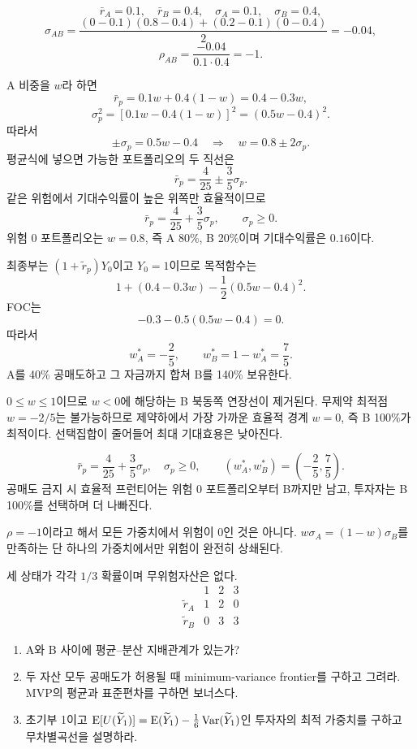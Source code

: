\begin{solutionbox}
\[
\bar r_A=0.1,\quad \bar r_B=0.4,
\quad\sigma_A=0.1,\quad\sigma_B=0.4,
\]
\[
\sigma_{AB}=\frac{(0-0.1)(0.8-0.4)+(0.2-0.1)(0-0.4)}2=-0.04,
\]
\[
\rho_{AB}=\frac{-0.04}{0.1\cdot0.4}=-1.
\]

A 비중을 $w$라 하면
\[
\bar r_p=0.1w+0.4(1-w)=0.4-0.3w,
\]
\[
\sigma_p^2=[0.1w-0.4(1-w)]^2=(0.5w-0.4)^2.
\]
따라서
\[
\pm\sigma_p=0.5w-0.4
\quad\Longrightarrow\quad
w=0.8\pm2\sigma_p.
\]
평균식에 넣으면 가능한 포트폴리오의 두 직선은
\[
\bar r_p=\frac4{25}\pm\frac35\sigma_p.
\]
같은 위험에서 기대수익률이 높은 위쪽만 효율적이므로
\[
\boxed{\bar r_p=\frac4{25}+\frac35\sigma_p,\qquad\sigma_p\ge0}.
\]
위험 0 포트폴리오는 $w=0.8$, 즉 A 80\%, B 20\%이며 기대수익률은 $0.16$이다.

최종부는 $(1+\widetilde r_p)Y_0$이고 $Y_0=1$이므로 목적함수는
\[
1+(0.4-0.3w)-\frac12(0.5w-0.4)^2.
\]
FOC는
\[
-0.3-0.5(0.5w-0.4)=0.
\]
따라서
\[
\boxed{w_A^*=-\frac25,\qquad w_B^*=1-w_A^*=\frac75}.
\]
A를 40\% 공매도하고 그 자금까지 합쳐 B를 140\% 보유한다.

$0\le w\le1$이므로 $w<0$에 해당하는 B 북동쪽 연장선이 제거된다. 무제약 최적점 $w=-2/5$는 불가능하므로 제약하에서 가장 가까운 효율적 경계 $w=0$, 즉 B 100\%가 최적이다. 선택집합이 줄어들어 최대 기대효용은 낮아진다.
\end{solutionbox}

\begin{answerbox}
\[
\bar r_p=\frac4{25}+\frac35\sigma_p,\quad\sigma_p\ge0,
\qquad
(w_A^*,w_B^*)=\left(-\frac25,\frac75\right).
\]
공매도 금지 시 효율적 프런티어는 위험 0 포트폴리오부터 B까지만 남고, 투자자는 B 100\%를 선택하며 더 나빠진다.
\end{answerbox}

\begin{warningbox}
$\rho=-1$이라고 해서 모든 가중치에서 위험이 0인 것은 아니다. $w\sigma_A=(1-w)\sigma_B$를 만족하는 단 하나의 가중치에서만 위험이 완전히 상쇄된다.
\end{warningbox}

\begin{officialbox}
세 상태가 각각 $1/3$ 확률이며 무위험자산은 없다.
\[
\begin{array}{c|ccc}
&1&2&3\\\hline
\widetilde r_A&1&2&0\\
\widetilde r_B&0&3&3
\end{array}
\]
\begin{enumerate}[label=(\alph*)]
\item A와 B 사이에 평균--분산 지배관계가 있는가?
\item 두 자산 모두 공매도가 허용될 때 minimum-variance frontier를 구하고 그려라. MVP의 평균과 표준편차를 구하면 보너스다.
\item 초기부 1이고 $\operatorname{E}[U(\widetilde Y_1)]=\operatorname{E}(\widetilde Y_1)-\frac16\operatorname{Var}(\widetilde Y_1)$인 투자자의 최적 가중치를 구하고 무차별곡선을 설명하라.
\end{enumerate}
\end{officialbox}


